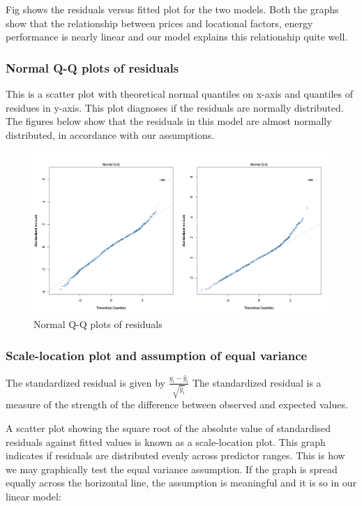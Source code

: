 \documentclass[12pt]{article}
\begin{document}
Fig shows the residuals versus fitted plot for the two models. Both the graphs show that the relationship between prices and locational factors, energy performance is nearly linear and our model explains this relationship quite well.

\subsubsection{Normal Q-Q plots of residuals}
This is a scatter plot with theoretical normal quantiles on x-axis and quantiles of residues in y-axis. This plot diagnoses if the residuals are normally distributed. The figures below show that the residuals in this model are almost normally distributed, in accordance with our assumptions.


\begin{figure}[H]
    \centering
    \includegraphics[width=18cm]{3.3 images/3.3.2plot.png}
    \caption{Normal Q-Q plots of residuals}
    \label{fig:qq}
\end{figure}

\subsubsection{Scale-location plot and assumption of equal variance}
 The standardized residual is given by $\frac{y_i-\hat y_i}{\sqrt{\hat y_i}}$
The standardized residual is a measure of the strength of the difference between observed and expected values. 

A scatter plot showing the square root of the absolute value of standardised residuals against fitted values is known as a scale-location plot.
This graph indicates if residuals are distributed evenly across predictor ranges.
This is how we may graphically test the equal variance assumption. If the graph is spread equally across the horizontal line, the assumption is meaningful and it is so in our linear model:
\end{document}
